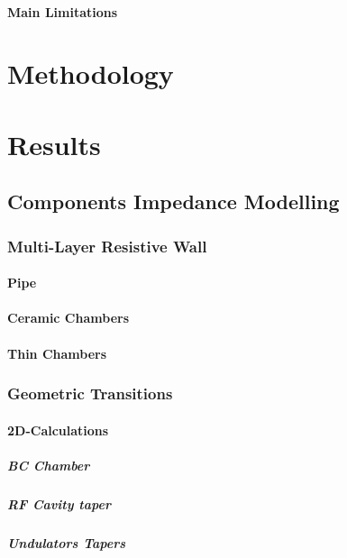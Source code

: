 \documentclass[
	12pt,				%
	openright,			%
	oneside,			%
	a4paper,		%
	chapter=TITLE,		%
	section=TITLE,		%
    brazil,				%
	english,			%
	sumario=tradicional,
	]{abntex2}
\begin{document}
      \subsubsection{Main Limitations}

\chapter{Methodology}
  \section{}

\chapter{Results}
  \section{Components Impedance Modelling}
    \subsection{Multi-Layer Resistive Wall}
      \subsubsection{Pipe}
      \subsubsection{Ceramic Chambers}
      \subsubsection{Thin Chambers}
    \subsection{Geometric Transitions}
      \subsubsection{2D-Calculations}
        \paragraph{BC Chamber}
        \paragraph{RF Cavity taper}
        \paragraph{Undulators Tapers}
\end{document}

